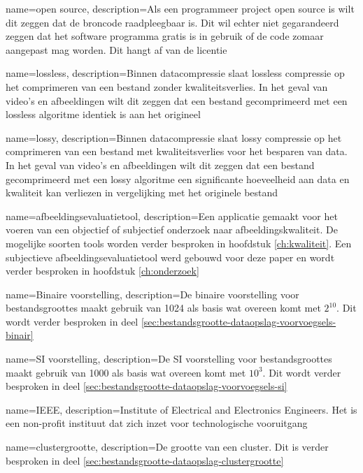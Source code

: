 {
	name={open source},
	description={Als een programmeer project open source is wilt dit zeggen dat de broncode raadpleegbaar is. Dit wil echter niet gegarandeerd zeggen dat het software programma gratis is in gebruik of de code zomaar aangepast mag worden. Dit hangt af van de licentie}
}

{
	name={lossless},
	description={Binnen datacompressie slaat lossless compressie op het comprimeren van een bestand zonder kwaliteitsverlies. In het geval van video's en afbeeldingen wilt dit zeggen dat een bestand gecomprimeerd met een lossless algoritme identiek is aan het origineel}
}

{
	name={lossy},
	description={Binnen datacompressie slaat lossy compressie op het comprimeren van een bestand met kwaliteitsverlies voor het besparen van data. In het geval van video's en afbeeldingen wilt dit zeggen dat een bestand gecomprimeerd met een lossy algoritme een significante hoeveelheid aan data en kwaliteit kan verliezen in vergelijking met het originele bestand}
}

{
	name={afbeeldingsevaluatietool},
	description={Een applicatie gemaakt voor het voeren van een objectief of subjectief onderzoek naar afbeeldingskwaliteit. De mogelijke soorten tools worden verder besproken in hoofdstuk \ref{ch:kwaliteit}. Een subjectieve afbeeldingsevaluatietool werd gebouwd voor deze paper en wordt verder besproken in hoofdstuk \ref{ch:onderzoek}}
}

{
	name={Binaire voorstelling},
	description={De binaire voorstelling voor bestandsgroottes maakt gebruik van 1024 als basis wat overeen komt met $ 2^{10} $. Dit wordt verder besproken in deel \ref{sec:bestandsgrootte-dataopslag-voorvoegsels-binair}}
}

{
	name={SI voorstelling},
	description={De SI voorstelling voor bestandsgroottes maakt gebruik van 1000 als basis wat overeen komt met $ 10^{3} $. Dit wordt verder besproken in deel \ref{sec:bestandsgrootte-dataopslag-voorvoegsels-si}}
}

{
	name={IEEE},
	description={Institute of Electrical and Electronics Engineers. Het is een non-profit instituut dat zich inzet voor technologische vooruitgang}
}

{
	name={clustergrootte},
	description={De grootte van een cluster. Dit is verder besproken in deel \ref{sec:bestandsgrootte-dataopslag-clustergrootte}}
}

